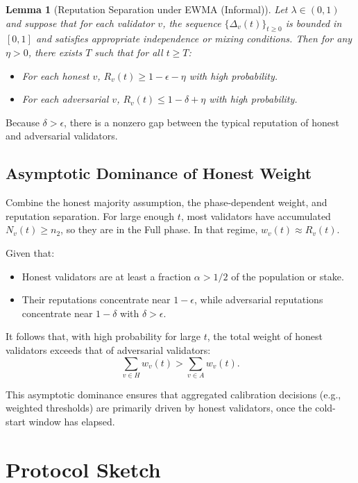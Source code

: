 \documentclass[11pt]{article}
\theoremstyle{plain}
\newtheorem{lemma}{Lemma}
\theoremstyle{definition}
\begin{document}
\begin{lemma}[Reputation Separation under EWMA (Informal)]
Let \(\lambda \in (0,1)\) and suppose that for each validator \(v\), the sequence \(\{\Delta_v(t)\}_{t \ge 0}\) is bounded in \([0,1]\) and satisfies appropriate independence or mixing conditions. Then for any \(\eta > 0\), there exists \(T\) such that for all \(t \ge T\):
\begin{itemize}[leftmargin=*]
  \item For each honest \(v\), \(R_v(t) \ge 1-\epsilon - \eta\) with high probability.
  \item For each adversarial \(v\), \(R_v(t) \le 1-\delta + \eta\) with high probability.
\end{itemize}
\end{lemma}

Because \(\delta > \epsilon\), there is a nonzero gap between the typical reputation of honest and adversarial validators.

\subsection{Asymptotic Dominance of Honest Weight}

Combine the honest majority assumption, the phase-dependent weight, and reputation separation. For large enough \(t\), most validators have accumulated \(N_v(t) \ge n_2\), so they are in the Full phase. In that regime, \(w_v(t) \approx R_v(t)\).

Given that:
\begin{itemize}[leftmargin=*]
  \item Honest validators are at least a fraction \(\alpha > 1/2\) of the population or stake.
  \item Their reputations concentrate near \(1-\epsilon\), while adversarial reputations concentrate near \(1-\delta\) with \(\delta > \epsilon\).
\end{itemize}
It follows that, with high probability for large \(t\), the total weight of honest validators exceeds that of adversarial validators:
\[
\sum_{v \in H} w_v(t) > \sum_{v \in A} w_v(t).
\]

This asymptotic dominance ensures that aggregated calibration decisions (e.g., weighted thresholds) are primarily driven by honest validators, once the cold-start window has elapsed.

\section{Protocol Sketch}
\end{document}
